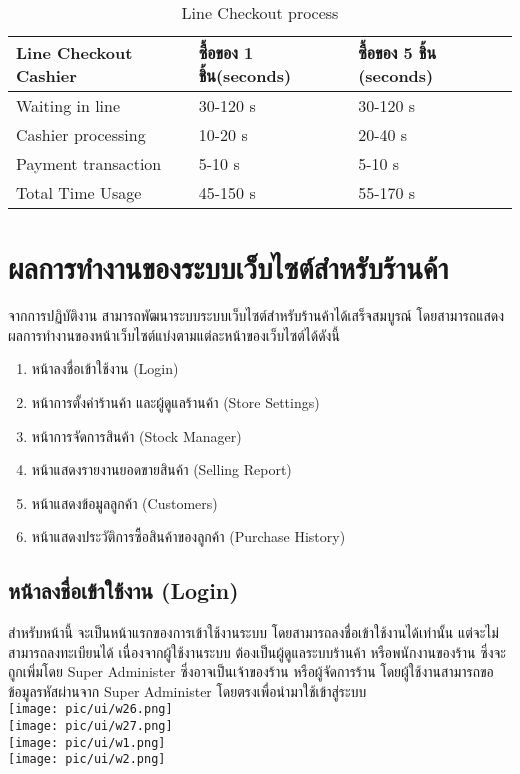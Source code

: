 \begin{table}[]
    \centering
    \caption{Line Checkout process}
    \begin{tabular}{|p{5cm}|p{4cm}|p{4cm}|}
        \hline
        \textbf{Line Checkout Cashier} & \textbf{ซื้อของ 1 ชิ้น(seconds)} & \textbf{ซื้อของ 5 ชิ้น (seconds)} \\
        \hline
        Waiting in line                & 30-120 s                     & 30-120 s                      \\
        Cashier processing             & 10-20 s                      & 20-40 s                       \\
        Payment transaction            & 5-10 s                       & 5-10 s                        \\
        \hline
        Total Time Usage               & 45-150 s                     & 55-170 s                      \\
        \hline
    \end{tabular}
\end{table}

\newpage
\section{ผลการทำงานของระบบเว็บไซต์สำหรับร้านค้า}
จากการปฏิบัติงาน สามารถพัฒนาระบบระบบเว็บไซต์สำหรับร้านค้าได้เสร็จสมบูรณ์ โดยสามารถแสดงผลการทำงานของหน้าเว็บไซต์แบ่งตามแต่ละหน้าของเว็บไซต์ได้ดังนี้
\begin{enumerate}
    \item หน้าลงชื่อเข้าใช้งาน (Login)
    \item หน้าการตั้งค่าร้านค้า และผู้ดูแลร้านค้า (Store Settings)
    \item หน้าการจัดการสินค้า (Stock Manager)
    \item หน้าแสดงรายงานยอดขายสินค้า (Selling Report)
    \item หน้าแสดงข้อมูลลูกค้า (Customers)
    \item หน้าแสดงประวัติการซื้อสินค้าของลูกค้า (Purchase History)
\end{enumerate}

\subsection{หน้าลงชื่อเข้าใช้งาน (Login)}
สำหรับหน้านี้ จะเป็นหน้าแรกของการเข้าใช้งานระบบ โดยสามารถลงชื่อเข้าใช้งานได้เท่านั้น แต่จะไม่สามารถลงทะเบียนได้ เนื่องจากผู้ใช้งานระบบ ต้องเป็นผู้ดูแลระบบร้านค้า หรือพนักงานของร้าน ซึ่งจะถูกเพิ่มโดย Super Administer ซึ่งอาจเป็นเจ้าของร้าน หรือผู้จัดการร้าน โดยผู้ใช้งานสามารถขอข้อมูลรหัสผ่านจาก Super Administer โดยตรงเพื่อนำมาใช้เข้าสู่ระบบ\\
{
\texttt{[image: pic/ui/w26.png]}
}\\
{
\texttt{[image: pic/ui/w27.png]}
}\\
{
\texttt{[image: pic/ui/w1.png]}
}\\
{
\texttt{[image: pic/ui/w2.png]}
}\\

